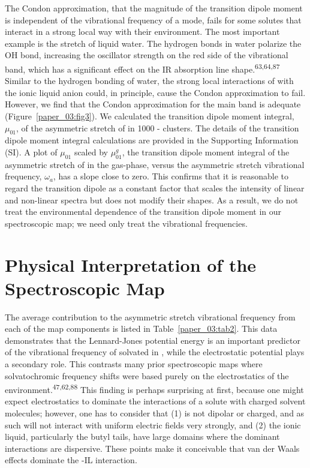 \documentclass[]{article}
\begin{document}
The Condon approximation, that the magnitude of the transition dipole moment is independent of the vibrational frequency of a mode, fails for some solutes that interact in a strong local way with their environment. The most important example is the  stretch of liquid water. The hydrogen bonds in water polarize the OH bond, increasing the oscillator strength on the red side of the vibrational band, which has a significant effect on the IR absorption line shape.\textsuperscript{63,64,87} Similar to the hydrogen bonding of water, the strong local interactions of  with the ionic liquid anion could, in principle, cause the Condon approximation to fail. However, we find that the Condon approximation for the main band is adequate (Figure~\ref{paper_03:fig3}). We calculated the transition dipole moment integral, \(\mu_{01}\), of the asymmetric stretch of  in \num{1000} -\ce{[C4C1im][PF6]} clusters. The details of the transition dipole moment integral calculations are provided in the Supporting Information (SI). A plot of \(\mu_{01}\) scaled by \(\mu_{01}^{g}\), the transition dipole moment integral of the asymmetric stretch of  in the gas-phase, versus the asymmetric stretch vibrational frequency, \(\omega_{a}\), has a slope close to zero. This confirms that it is reasonable to regard the transition dipole as a constant factor that scales the intensity of linear and non-linear spectra but does not modify their shapes. As a result, we do not treat the environmental dependence of the transition dipole moment in our spectroscopic map; we need only treat the vibrational frequencies.

\section{Physical Interpretation of the Spectroscopic Map}
\label{paper_03:sec:IV}

The average contribution to the  asymmetric stretch vibrational frequency from each of the map components is listed in Table~\ref{paper_03:tab2}. This data demonstrates that the Lennard-Jones potential energy is an important predictor of the vibrational frequency of  solvated in \ce{[C4C1im][PF6]}, while the electrostatic potential plays a secondary role. This contrasts many prior spectroscopic maps where solvatochromic frequency shifts were based purely on the electrostatics of the environment.\textsuperscript{47,62,88} This finding is perhaps surprising at first, because one might expect electrostatics to dominate the interactions of a solute with charged solvent molecules; however, one has to consider that (1)  is not dipolar or charged, and as such will not interact with uniform electric fields very strongly, and (2) the ionic liquid, particularly the \ce{[C4C1im]+} butyl tails, have large domains where the dominant interactions are dispersive. These points make it conceivable that van der Waals effects dominate the -IL interaction.
\end{document}
